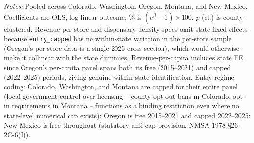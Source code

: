 \begin{table}[htbp]
\centering
\caption{Main pooled specification: border $\times$ entry-regime interaction}
\label{tab:main_pooled}
\footnotesize
{}
\begin{minipage}{0.98\textwidth}
\vspace{0.3em}
\footnotesize
\textit{Notes:} Pooled across Colorado, Washington, Oregon, Montana, and New Mexico. Coefficients are OLS,
log-linear outcome; \% is $(e^{\hat\beta}-1)\times 100$. $p$ (cl.) is county-clustered. Revenue-per-store and
dispensary-density specs omit state fixed effects because \texttt{entry\_capped} has no within-state variation
in the per-store sample (Oregon's per-store data is a single 2025 cross-section), which would otherwise make
it collinear with the state dummies. Revenue-per-capita includes state FE since Oregon's per-capita panel
spans both its free (2015--2021) and capped (2022--2025) periods, giving genuine within-state identification.
Entry-regime coding: Colorado, Washington, and Montana are capped for their entire panel (local-government
control over licensing -- county opt-out bans in Colorado, opt-in requirements in Montana -- functions as a
binding restriction even where no state-level numerical cap exists); Oregon is free 2015--2021 and capped
2022--2025; New Mexico is free throughout (statutory anti-cap provision, NMSA 1978 \S 26-2C-6(I)).
\end{minipage}
\end{table}
